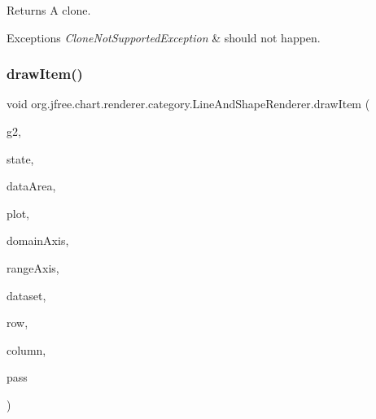 \begin{DoxyReturn}{Returns}
A clone.
\end{DoxyReturn}

\begin{DoxyExceptions}{Exceptions}
{\em Clone\+Not\+Supported\+Exception} & should not happen. \\
\hline
\end{DoxyExceptions}
\mbox{\label{classorg_1_1jfree_1_1chart_1_1renderer_1_1category_1_1_line_and_shape_renderer_a9e8ead8e79beb886b4a1be1d3a58ed22}} 
\subsubsection{\texorpdfstring{draw\+Item()}{drawItem()}}
{\footnotesize\ttfamily void org.\+jfree.\+chart.\+renderer.\+category.\+Line\+And\+Shape\+Renderer.\+draw\+Item (\begin{DoxyParamCaption}\item[{Graphics2D}]{g2,  }\item[{\mbox{\hyperlink{classorg_1_1jfree_1_1chart_1_1renderer_1_1category_1_1_category_item_renderer_state}{Category\+Item\+Renderer\+State}}}]{state,  }\item[{Rectangle2D}]{data\+Area,  }\item[{\mbox{\hyperlink{classorg_1_1jfree_1_1chart_1_1plot_1_1_category_plot}{Category\+Plot}}}]{plot,  }\item[{\mbox{\hyperlink{classorg_1_1jfree_1_1chart_1_1axis_1_1_category_axis}{Category\+Axis}}}]{domain\+Axis,  }\item[{\mbox{\hyperlink{classorg_1_1jfree_1_1chart_1_1axis_1_1_value_axis}{Value\+Axis}}}]{range\+Axis,  }\item[{\mbox{\hyperlink{interfaceorg_1_1jfree_1_1data_1_1category_1_1_category_dataset}{Category\+Dataset}}}]{dataset,  }\item[{int}]{row,  }\item[{int}]{column,  }\item[{int}]{pass }\end{DoxyParamCaption})}

